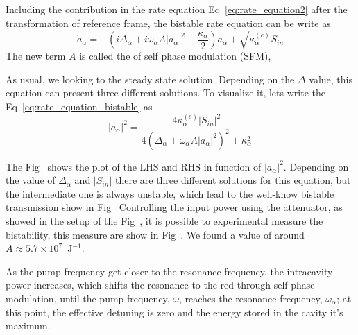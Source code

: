 Including the contribution in the rate equation Eq~\ref{eq:rate_equation2} after the transformation of reference frame, the bistable rate equation can be write as 
\begin{equation}
\dot{a}_\alpha = -\left(i\Delta_\alpha + i\omega_\alpha A|a_\alpha|^2 + \frac{\kappa_\alpha}{2}\right)a_\alpha + \sqrt{\kappa^{(e)}_\alpha}S_{in}
\label{eq:rate_equation_bistable}
\end{equation}
The new term $A$ is called the of self phase modulation (SFM),

As usual, we looking to the steady state solution. Depending on the $\Delta$ value, this equation can present three different solutions. To visualize it, lets write the Eq~\ref{eq:rate_equation_bistable} as 
\begin{equation}
    |a_\alpha|^2 = \frac{4\kappa^{(e)}_\alpha |S_{in}|^2}{4\left(\Delta_\alpha + \omega_\alpha A|a_\alpha|^2\right)^2+\kappa_\alpha^2} 
\end{equation}

The Fig~
shows the plot of the LHS and RHS in function of $|a_\alpha|^2$. Depending on the value of $\Delta_\alpha$ and $|S_{in}|$ there are three different solutions for this equation, but the intermediate one is always unstable, which lead to the well-know bistable transmission show in Fig~
Controlling the input power using the attenuator, as showed in the setup of the Fig~, it is possible to experimental measure the bistability, this measure are show in Fig~. We found a value of around $A\approx 5.7\times10^7$~J$^{-1}$.

As the pump frequency get closer to the resonance frequency, the intracavity power increases, which shifts the resonance to the red through self-phase modulation, until the pump frequency, $\omega$, reaches the resonance frequency, $\omega_\alpha$; at this point, the effective detuning is zero and the energy stored in the cavity it's maximum.  

